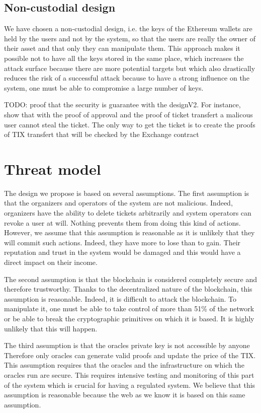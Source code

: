 \documentclass[a4paper,11pt,oneside]{report}
\begin{document}
\subsection{Non-custodial design}
We have chosen a non-custodial design, i.e. the keys of the Ethereum wallets are held by the users and not by the system, so that the users are really the owner of their asset and that only they can manipulate them. This approach makes it possible not to have all the keys stored in the same place, which increases the attack surface because there are more potential targets but which also drastically reduces the risk of a successful attack because to have a strong influence on the system, one must be able to compromise a large number of keys.

TODO: proof that the security is guarantee with the designV2. For instance, show that with the proof of approval and the proof of ticket transfert a malicous user cannot steal the ticket. The only way to get the ticket is to create the proofs of TIX transfert that will be checked by the Exchange contract

\section{Threat model}
The design we propose is based on several assumptions. The first assumption is that the organizers and operators of the system are not malicious. Indeed, organizers have the ability to delete tickets arbitrarily and system operators can revoke a user at will. Nothing prevents them from doing this kind of actions. However, we assume that this assumption is reasonable as it is unlikely that they will commit such actions. Indeed, they have more to lose than to gain. Their reputation and trust in the system would be damaged and this would have a direct impact on their income.

The second assumption is that the blockchain is considered completely secure and therefore trustworthy. Thanks to the decentralized nature of the blockchain, this assumption is reasonable. Indeed, it is difficult to attack the blockchain. To manipulate it, one must be able to take control of more than 51\% of the network or be able to break the cryptographic primitives on which it is based. It is highly unlikely that this will happen.

The third assumption is that the oracles private key is not accessible by anyone Therefore only oracles can generate valid proofs and update the price of the TIX. This assumption requires that the oracles and the infrastructure on which the oracles run are secure. This requires intensive testing and monitoring of this part of the system which is crucial for having a regulated system. We believe that this assumption is reasonable because the web as we know it is based on this same assumption.
\end{document}
